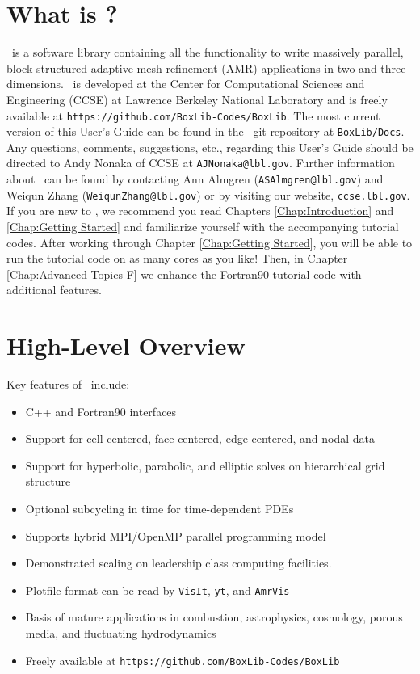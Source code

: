 \section{What is \BoxLib?}

\BoxLib\ is a software library containing all the functionality to write massively parallel, 
block-structured adaptive mesh refinement (AMR) applications in two and three dimensions.
\BoxLib\ is developed at the Center for Computational Sciences and Engineering (CCSE) at 
Lawrence Berkeley National Laboratory and is freely available
at {\tt https://github.com/BoxLib-Codes/BoxLib}.
The most current version of this User's Guide
can be found in the \BoxLib\ git repository at {\tt BoxLib/Docs}.  Any questions,
comments, suggestions, etc., regarding this User's Guide should be directed
to Andy Nonaka of CCSE at {\tt AJNonaka@lbl.gov}.  Further information 
about \BoxLib\ can be found by contacting Ann Almgren 
({\tt ASAlmgren@lbl.gov}) and Weiqun Zhang ({\tt WeiqunZhang@lbl.gov})
or by visiting our website, {\tt ccse.lbl.gov}.\\

If you are new to \BoxLib, we recommend you read Chapters \ref{Chap:Introduction} and
\ref{Chap:Getting Started} and familiarize yourself with the accompanying tutorial codes.
After working through Chapter \ref{Chap:Getting Started}, you will be able to run the tutorial
code on as many cores as you like!  Then, in Chapter \ref{Chap:Advanced Topics F} we enhance 
the Fortran90 tutorial code with additional features.

\section{High-Level Overview}

Key features of \BoxLib\ include:
\begin{itemize}
\item C++ and Fortran90 interfaces
\item Support for cell-centered, face-centered, edge-centered, and nodal data
\item Support for hyperbolic, parabolic, and elliptic solves on hierarchical grid structure
\item Optional subcycling in time for time-dependent PDEs
\item Supports hybrid MPI/OpenMP parallel programming model
\item Demonstrated scaling on leadership class computing facilities.
\item Plotfile format can be read by {\tt VisIt}, {\tt yt}, and {\tt AmrVis}
\item Basis of mature applications in combustion, astrophysics, cosmology, porous media, 
      and fluctuating hydrodynamics
\item Freely available at {\tt https://github.com/BoxLib-Codes/BoxLib}
\end{itemize}


